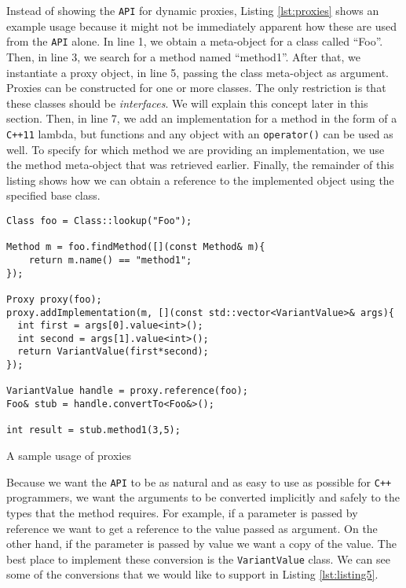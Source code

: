 Instead of showing the \texttt{API} for dynamic proxies, Listing \ref{lst:proxies} shows an example
usage because it might not be immediately apparent how these are used from the \texttt{API} alone.
In line 1, we obtain a meta-object for a class called ``Foo''. Then, in line 3, we search for a
method named ``method1''. After that, we instantiate a proxy object, in line 5, passing the class
meta-object as argument. Proxies can be constructed for one or more classes. The only restriction is
that these classes should be \emph{interfaces}. We will explain this concept later in this section.
Then, in line 7, we add an implementation for a method in the form of a \texttt{C++11} lambda, but functions
and any object with an \texttt{operator()} can be used as well. To specify for which method we are
providing an implementation, we use the method meta-object that was retrieved earlier.
Finally, the remainder of this listing shows how we can obtain a reference to the implemented object
using the specified base class.

\begin{listing}
\begin{verbatim}
Class foo = Class::lookup("Foo");

Method m = foo.findMethod([](const Method& m){
    return m.name() == "method1";
});

Proxy proxy(foo);
proxy.addImplementation(m, [](const std::vector<VariantValue>& args){
  int first = args[0].value<int>();
  int second = args[1].value<int>();
  return VariantValue(first*second);
});

VariantValue handle = proxy.reference(foo);
Foo& stub = handle.convertTo<Foo&>();

int result = stub.method1(3,5);
\end{verbatim}
\caption{A sample usage of proxies}
\label{lst:proxies}
\end{listing}

Because we want the \texttt{API} to be as natural and as easy to use as possible for \texttt{C++} programmers,
we want the arguments to be converted implicitly and safely to the types that the method requires.
For example, if a parameter is passed by reference we want to get a reference to the value passed as argument.
On the other hand, if the parameter is passed by value we want a copy of the value. The best place to implement
these conversion is the \texttt{VariantValue} class. We can see some of the conversions that we would like to
support in Listing \ref{lst:listing5}.

